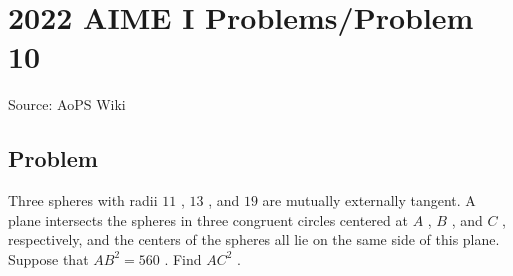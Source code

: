 \documentclass[12pt]{article}
\begin{document}
\section*{{2022 AIME I Problems/Problem 10}}
Source: AoPS Wiki

\subsection*{Problem}
Three spheres with radii $11$ , $13$ , and $19$ are mutually externally tangent. A plane intersects the spheres in three congruent circles centered at $A$ , $B$ , and $C$ , respectively, and the centers of the spheres all lie on the same side of this plane. Suppose that $AB^2 = 560$ . Find $AC^2$ .
\end{document}
